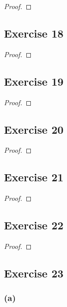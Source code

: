 \documentclass[14pt]{extarticle}
\begin{document}
\begin{proof}

\end{proof}

\subsection{Exercise 18}

\begin{proof}

\end{proof}

\subsection{Exercise 19}

\begin{proof}

\end{proof}

\subsection{Exercise 20}

\begin{proof}

\end{proof}

\subsection{Exercise 21}

\begin{proof}

\end{proof}

\subsection{Exercise 22}

\begin{proof}

\end{proof}

\subsection{Exercise 23}

\subsubsection{(a)}
\end{document}
